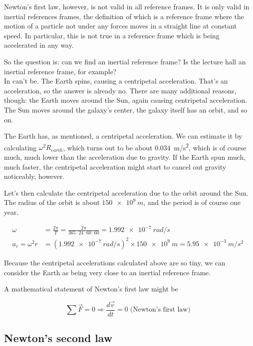 Newton's first law, however, is not valid in all reference frames. It is only valid in inertial references frames, the definition of which is a reference frame where the motion of a particle not under any forces moves in a straight line at constant speed. In particular, this is not true in a reference frame which is being accelerated in any way.

So the question is: can we find an inertial reference frame? Is the lecture hall an inertial reference frame, for example?\\
In can't be. The Earth spins, causing a centripetal acceleration. That's an acceleration, so the answer is already no. There are many additional reasons, though: the Earth moves around the Sun, again causing centripetal acceleration. The Sun moves around the galaxy's center, the galaxy itself has an orbit, and so on.

The Earth has, as mentioned, a centripetal acceleration. We can estimate it by calculating $\omega^2 R_{earth}$, which turns out to be about \SI{0.034}{m/s^2}, which is of course much, much lower than the acceleration due to gravity. If the Earth spun much, much faster, the centripetal acceleration might start to cancel out gravity noticeably, however.

Let's then calculate the centripetal acceleration due to the orbit around the Sun. The radius of the orbit is about $\SI{150e9}{m}$, and the period is of course one year.

\begin{align}
\omega &= \frac{2 \pi}{T} = \frac{2 \pi}{365 \cdot 24 \cdot 60 \cdot 60} = \SI{1.992e-7}{rad/s}\\
a_c = \omega^2 r &= (\SI{1.992e-7}{rad/s})^2 \times \SI{150e9}{m} = \SI{5.95e-3}{m/s^2}
\end{align}

Because the centripetal accelerations calculated above are so tiny, we can consider the Earth as being very close to an inertial reference frame.

A mathematical statement of Newton's first law might be

\begin{equation}
\sum \vec{F} = 0 \Rightarrow \frac{d\vec{v}}{dt} = 0 \text{ (Newton's first law)} \label{eq:newton1}
\end{equation}

\subsection{Newton's second law}

